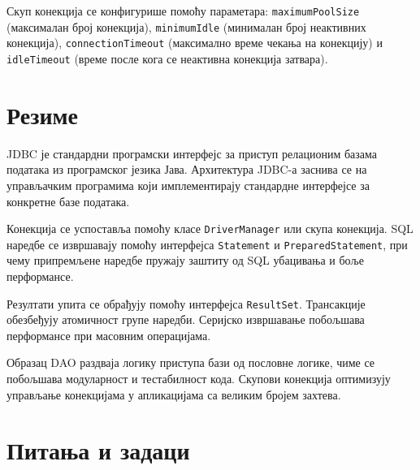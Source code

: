 Скуп конекција се конфигурише помоћу параметара: \texttt{maximumPoolSize} (максималан број конекција), \texttt{minimumIdle} (минималан број неактивних конекција), \texttt{connectionTimeout} (максимално време чекања на конекцију) и \texttt{idleTimeout} (време после кога се неактивна конекција затвара).


\section{Резиме}

JDBC је стандардни програмски интерфејс за приступ релационим базама података из програмског језика Јава. Архитектура JDBC-а заснива се на управљачким програмима који имплементирају стандардне интерфејсе за конкретне базе података.

Конекција се успоставља помоћу класе \texttt{DriverManager} или скупа конекција. SQL наредбе се извршавају помоћу интерфејса \texttt{Statement} и \texttt{PreparedStatement}, при чему припремљене наредбе пружају заштиту од SQL убацивања и боље перформансе.

Резултати упита се обрађују помоћу интерфејса \texttt{ResultSet}. Трансакције обезбеђују атомичност групе наредби. Серијско извршавање побољшава перформансе при масовним операцијама.

Образац DAO раздваја логику приступа бази од пословне логике, чиме се побољшава модуларност и тестабилност кода. Скупови конекција оптимизују управљање конекцијама у апликацијама са великим бројем захтева.


\section{Питања и задаци}

